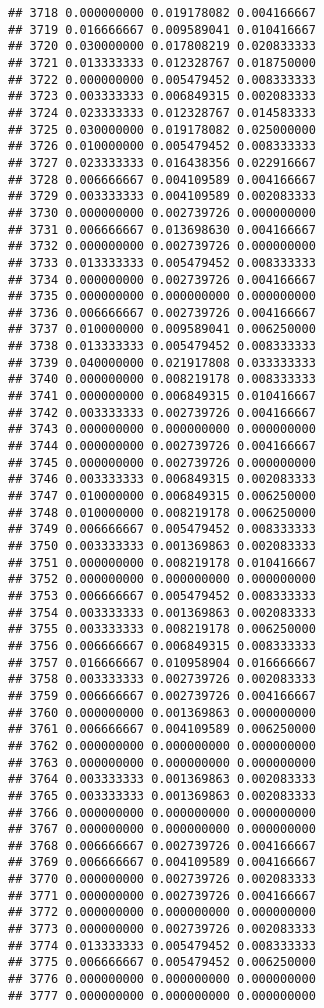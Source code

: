 \documentclass[
]{article}
\begin{document}
\begin{verbatim}
## 3718 0.000000000 0.019178082 0.004166667
## 3719 0.016666667 0.009589041 0.010416667
## 3720 0.030000000 0.017808219 0.020833333
## 3721 0.013333333 0.012328767 0.018750000
## 3722 0.000000000 0.005479452 0.008333333
## 3723 0.003333333 0.006849315 0.002083333
## 3724 0.023333333 0.012328767 0.014583333
## 3725 0.030000000 0.019178082 0.025000000
## 3726 0.010000000 0.005479452 0.008333333
## 3727 0.023333333 0.016438356 0.022916667
## 3728 0.006666667 0.004109589 0.004166667
## 3729 0.003333333 0.004109589 0.002083333
## 3730 0.000000000 0.002739726 0.000000000
## 3731 0.006666667 0.013698630 0.004166667
## 3732 0.000000000 0.002739726 0.000000000
## 3733 0.013333333 0.005479452 0.008333333
## 3734 0.000000000 0.002739726 0.004166667
## 3735 0.000000000 0.000000000 0.000000000
## 3736 0.006666667 0.002739726 0.004166667
## 3737 0.010000000 0.009589041 0.006250000
## 3738 0.013333333 0.005479452 0.008333333
## 3739 0.040000000 0.021917808 0.033333333
## 3740 0.000000000 0.008219178 0.008333333
## 3741 0.000000000 0.006849315 0.010416667
## 3742 0.003333333 0.002739726 0.004166667
## 3743 0.000000000 0.000000000 0.000000000
## 3744 0.000000000 0.002739726 0.004166667
## 3745 0.000000000 0.002739726 0.000000000
## 3746 0.003333333 0.006849315 0.002083333
## 3747 0.010000000 0.006849315 0.006250000
## 3748 0.010000000 0.008219178 0.006250000
## 3749 0.006666667 0.005479452 0.008333333
## 3750 0.003333333 0.001369863 0.002083333
## 3751 0.000000000 0.008219178 0.010416667
## 3752 0.000000000 0.000000000 0.000000000
## 3753 0.006666667 0.005479452 0.008333333
## 3754 0.003333333 0.001369863 0.002083333
## 3755 0.003333333 0.008219178 0.006250000
## 3756 0.006666667 0.006849315 0.008333333
## 3757 0.016666667 0.010958904 0.016666667
## 3758 0.003333333 0.002739726 0.002083333
## 3759 0.006666667 0.002739726 0.004166667
## 3760 0.000000000 0.001369863 0.000000000
## 3761 0.006666667 0.004109589 0.006250000
## 3762 0.000000000 0.000000000 0.000000000
## 3763 0.000000000 0.000000000 0.000000000
## 3764 0.003333333 0.001369863 0.002083333
## 3765 0.003333333 0.001369863 0.002083333
## 3766 0.000000000 0.000000000 0.000000000
## 3767 0.000000000 0.000000000 0.000000000
## 3768 0.006666667 0.002739726 0.004166667
## 3769 0.006666667 0.004109589 0.004166667
## 3770 0.000000000 0.002739726 0.002083333
## 3771 0.000000000 0.002739726 0.004166667
## 3772 0.000000000 0.000000000 0.000000000
## 3773 0.000000000 0.002739726 0.002083333
## 3774 0.013333333 0.005479452 0.008333333
## 3775 0.006666667 0.005479452 0.006250000
## 3776 0.000000000 0.000000000 0.000000000
## 3777 0.000000000 0.000000000 0.000000000

\end{verbatim}
\end{document}
